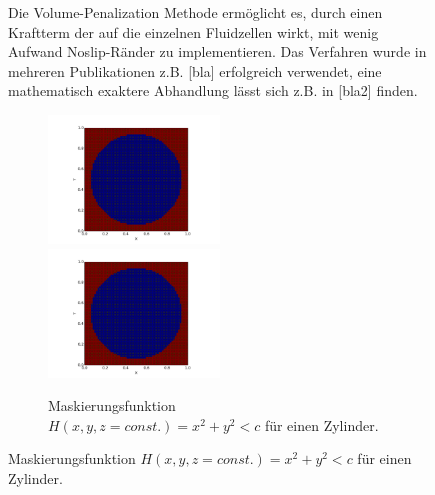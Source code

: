 \begin{figure}[!tpb]
  \centering
Die Volume-Penalization Methode ermöglicht es, durch einen Kraftterm der auf die einzelnen Fluidzellen wirkt, mit wenig Aufwand Noslip-Ränder zu implementieren.
Das Verfahren wurde in mehreren Publikationen z.B. [bla] erfolgreich verwendet, eine mathematisch exaktere Abhandlung lässt sich z.B. in [bla2] finden.

\begin{figure}
  \begin{center}
  \includegraphics[width=0.5\textwidth]{gfx/immersed_boundary/mask.png}\label{fig:mask_vp}
  \includegraphics[width=0.5\textwidth]{gfx/immersed_boundary/mask.png}\label{fig:mask_vp}
  \end{center}
  \caption{Maskierungsfunktion $H(x,y,z=const.) = x^2 + y^2 < c$ für einen Zylinder. }
\end{figure}


\end{figure}
